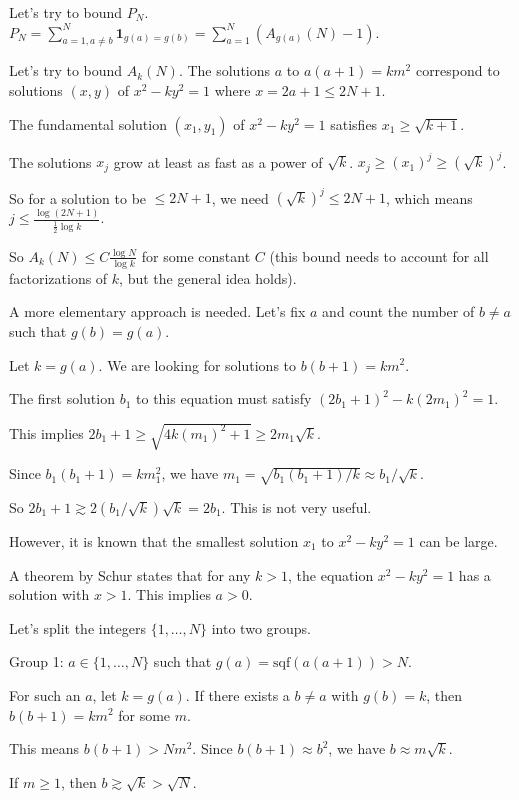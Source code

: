 \documentclass[12pt,a4paper]{article}
\theoremstyle{definition}
\begin{document}
    Let's try to bound $P_N$.
    $P_N = \sum_{a=1, a \neq b}^N \mathbf{1}_{g(a)=g(b)} = \sum_{a=1}^N (A_{g(a)}(N)-1)$.

    Let's try to bound $A_k(N)$. The solutions $a$ to $a(a+1)=km^2$ correspond to solutions $(x,y)$ of $x^2-ky^2=1$ where $x=2a+1 \leq 2N+1$.

    The fundamental solution $(x_1, y_1)$ of $x^2-ky^2=1$ satisfies $x_1 \geq \sqrt{k+1}$.

    The solutions $x_j$ grow at least as fast as a power of $\sqrt{k}$.
    $x_j \geq (x_1)^j \geq (\sqrt{k})^j$.

    So for a solution to be $\leq 2N+1$, we need $(\sqrt{k})^j \leq 2N+1$, which means $j \leq \frac{\log(2N+1)}{\frac{1}{2}\log k}$.

    So $A_k(N) \leq C \frac{\log N}{\log k}$ for some constant $C$ (this bound needs to account for all factorizations of $k$, but the general idea holds).

    A more elementary approach is needed. Let's fix $a$ and count the number of $b \neq a$ such that $g(b)=g(a)$.

    Let $k=g(a)$. We are looking for solutions to $b(b+1)=km^2$.

    The first solution $b_1$ to this equation must satisfy $(2b_1+1)^2 - k(2m_1)^2 = 1$.

    This implies $2b_1+1 \geq \sqrt{4k(m_1)^2+1} \geq 2m_1\sqrt{k}$.

    Since $b_1(b_1+1)=km_1^2$, we have $m_1 = \sqrt{b_1(b_1+1)/k} \approx b_1/\sqrt{k}$.

    So $2b_1+1 \gtrsim 2(b_1/\sqrt{k})\sqrt{k} = 2b_1$. This is not very useful.

    However, it is known that the smallest solution $x_1$ to $x^2-ky^2=1$ can be large.

    A theorem by Schur states that for any $k>1$, the equation $x^2-ky^2=1$ has a solution with $x>1$. This implies $a>0$.

    Let's split the integers $\{1, \dots, N\}$ into two groups.

    Group 1: $a \in \{1, \dots, N\}$ such that $g(a) = \text{sqf}(a(a+1)) > N$.

    For such an $a$, let $k = g(a)$. If there exists a $b \neq a$ with $g(b)=k$, then $b(b+1)=k m^2$ for some $m$.

    This means $b(b+1) > N m^2$. Since $b(b+1) \approx b^2$, we have $b \approx m\sqrt{k}$.

    If $m \geq 1$, then $b \gtrsim \sqrt{k} > \sqrt{N}$.
\end{document}
